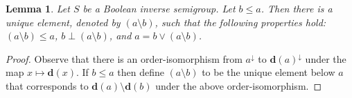 \documentclass[a4paper]{amsart}
\newtheorem{lemma}[theorem]{Lemma}
\begin{document}
\begin{lemma}\label{lem:complement} Let $S$ be a Boolean inverse semigroup.
Let $b \leq a$.
Then there is a unique element, denoted by $(a \setminus b)$, such that the following properties hold:
$(a \setminus b) \leq a$, 
$b \perp (a \setminus b)$,  
and $a = b \vee (a \setminus b)$.
\end{lemma}
\begin{proof} Observe that there is an order-isomorphism from $a^{\downarrow}$ to $\mathbf{d}(a)^{\downarrow}$ under the map $x \mapsto \mathbf{d}(x)$.
If $b \leq a$ then define $(a \setminus b)$ to be the unique element below $a$ that corresponds to $\mathbf{d}(a) \setminus \mathbf{d}(b)$ under the above order-isomorphism. 
\end{proof}





\end{document}
